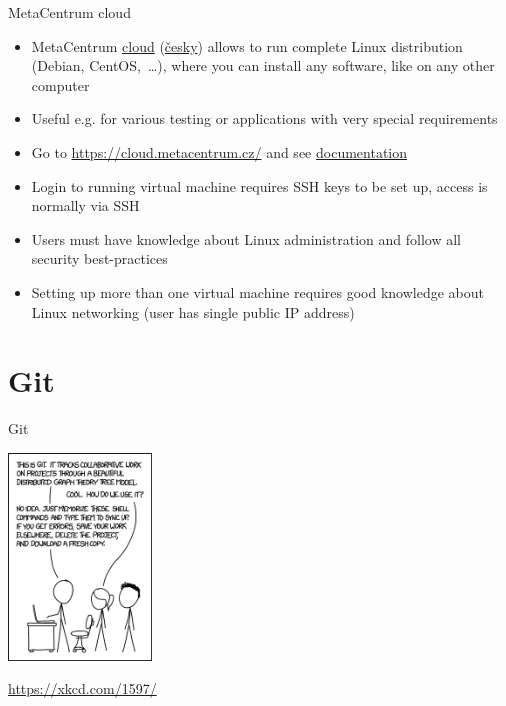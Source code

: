 \documentclass[compress, xelatex, 11pt, xcolor=svgnames, aspectratio=169,
	hyperref={
		bookmarks=true,
		unicode=true,
		colorlinks=true,
		pdftitle={Linux, command line and MetaCentrum},
		plainpages=false,
		pdfauthor={Vojtech Zeisek},
		pdfsubject={Course about use of Linux command line, writing shell scripts and using MetaCentrum of CESNET},
		pdfcreator={XeLaTeX},
		pdfkeywords={Linux, GNU, BASH, shell, command line, MetaCentrum},
		linkcolor=DarkRed, %
		anchorcolor=DarkBlue, %
		citecolor=Indigo, %
		filecolor=NavyBlue, %
		menucolor=DarkMagenta, %
		urlcolor=DarkBlue, %
		},
	url={hyphens, lowtilde} %
	]{beamer}
\begin{document}
\begin{frame}{MetaCentrum cloud}
	\begin{itemize}
		\item MetaCentrum \href{https://wiki.metacentrum.cz/wiki/Kategorie:Clouds}{cloud} (\href{https://wiki.metacentrum.cz/wiki/Kategorie:Cloudy}{česky}) allows to run complete Linux distribution (Debian, CentOS,~\ldots), where you can install any software, like on any other computer
		\item Useful e.g. for various testing or applications with very special requirements
		\item Go to \url{https://cloud.metacentrum.cz/} and see \href{https://docs.cloud.muni.cz/}{documentation}
		\item Login to running virtual machine requires SSH keys to be set up, access is normally via SSH
		\item Users must have knowledge about Linux administration and follow all security best-practices
		\item Setting up more than one virtual machine requires good knowledge about Linux networking (user has single public IP address)
	\end{itemize}
\end{frame}

\section{Git}

\begin{frame}{Git}
	\begin{multicols}{2}
		\vfill
		\tableofcontents[currentsection, sectionstyle=show/hide, hideothersubsections]
		\columnbreak
		\begin{center}
			\includegraphics[height=5.5cm]{git_xkcd.png}
		\end{center}
		\begin{flushright}
			\url{https://xkcd.com/1597/}
		\end{flushright}
	\end{multicols}
\end{frame}
\end{document}
